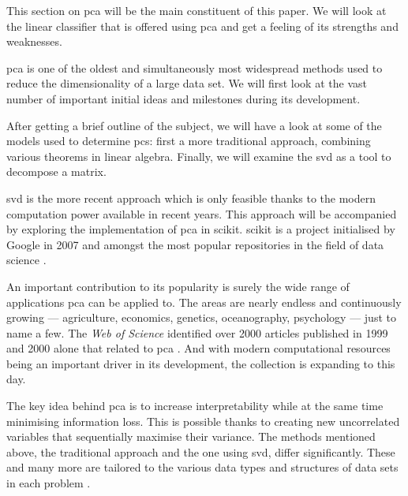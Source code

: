 This section on \gls{pca} will be the main constituent of this paper.
We will look at the linear classifier that is offered using \gls{pca} and get a feeling of its strengths and weaknesses.
\bigskip


\Gls{pca} is one of the oldest and simultaneously most widespread methods used to reduce the dimensionality of a large data set.
We will first look at the vast number of important initial ideas and milestones during its development.

After getting a brief outline of the subject, we will have a look at some of the models used to determine \glspl{pc}: first a more traditional approach, combining various theorems in linear algebra. 
Finally, we will examine the \gls{svd} as a tool to decompose a matrix.

\Gls{svd} is the more recent approach which is only feasible thanks to the modern computation power available in recent years.
This approach will be accompanied by exploring the implementation of \gls{pca} in \gls{scikit}.
\Gls{scikit} is a project initialised by Google in 2007 and amongst the most popular repositories in the field of data science \cite{scikit-learn}.
\bigskip


An important contribution to its popularity is surely the wide range of applications \gls{pca} can be applied to.
The areas are nearly endless and continuously growing --- agriculture, economics, genetics, oceanography, psychology --- just to name a few.
The \emph{Web of Science} identified over 2000 articles published in 1999 and 2000 alone that related to \gls{pca} \cite{Jolliffe2002book}.
And with modern computational resources being an important driver in its development, the collection is expanding to this day.
\bigskip


The key idea behind \gls{pca} is to increase interpretability while at the same time minimising information loss. 
This is possible thanks to creating new uncorrelated variables that sequentially maximise their variance.
The methods mentioned above, the traditional approach and the one using \gls{svd}, differ significantly. 
These and many more are tailored to the various data types and structures of data sets in each problem \cite{jolliffe2016principal}.


